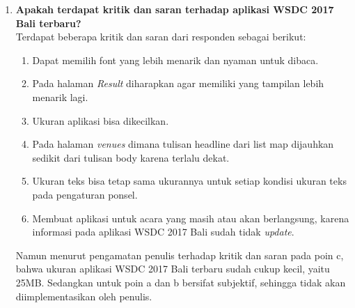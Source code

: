 \begin{enumerate}
	\item \textbf{Apakah terdapat kritik dan saran terhadap aplikasi WSDC 2017 Bali terbaru?} \\
	Terdapat beberapa kritik dan saran dari responden sebagai berikut:
	\begin{enumerate}
		\item Dapat memilih font yang lebih menarik dan nyaman untuk dibaca.
		\item Pada halaman \textit{Result} diharapkan agar memiliki yang tampilan lebih menarik lagi.
		\item Ukuran aplikasi bisa dikecilkan.
		\item Pada halaman \textit{venues} dimana tulisan headline dari list map dijauhkan sedikit dari tulisan body karena terlalu dekat.
		
		\item Ukuran teks bisa tetap sama ukurannya untuk setiap kondisi ukuran teks pada pengaturan ponsel.
		\item Membuat aplikasi untuk acara yang masih atau akan berlangsung, karena informasi pada aplikasi WSDC 2017 Bali sudah tidak \textit{update}.
	\end{enumerate}
	
		Namun menurut pengamatan penulis terhadap kritik dan saran pada poin c, bahwa ukuran aplikasi WSDC 2017 Bali terbaru sudah cukup kecil, yaitu 25MB. Sedangkan untuk poin a dan b bersifat subjektif, sehingga tidak akan diimplementasikan oleh penulis.

\end{enumerate}
